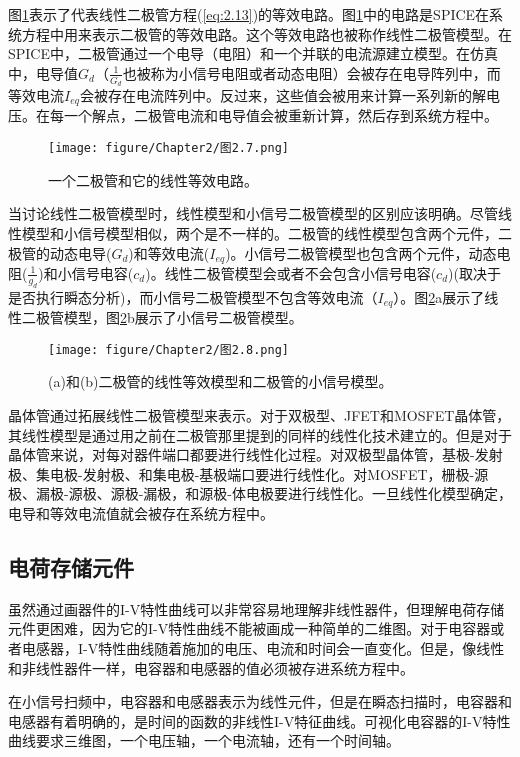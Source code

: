 图\ref{图2.7}表示了代表线性二极管方程(\ref{eq:2.13})的等效电路。图\ref{图2.7}中的电路是SPICE在系统方程中用来表示二极管的等效电路。这个等效电路也被称作线性二极管模型。在SPICE中，二极管通过一个电导（电阻）和一个并联的电流源建立模型。在仿真中，电导值$G_{d}$（$\frac{1}{G_d}$也被称为小信号电阻或者动态电阻）会被存在电导阵列中，而等效电流$I_{eq}$会被存在电流阵列中。反过来，这些值会被用来计算一系列新的解电压。在每一个解点，二极管电流和电导值会被重新计算，然后存到系统方程中。
\begin{figure}[htbp]
\small
    \centering
    \texttt{[image: figure/Chapter2/图2.7.png]}
    \caption{一个二极管和它的线性等效电路。}
    \label{图2.7}
\end{figure}

当讨论线性二极管模型时，线性模型和小信号二极管模型的区别应该明确。尽管线性模型和小信号模型相似，两个是不一样的。二极管的线性模型包含两个元件，二极管的动态电导($G_d$)和等效电流($I_{eq}$)。小信号二极管模型也包含两个元件，动态电阻($\frac{1}{g_d}$)和小信号电容($c_d$)。线性二极管模型会或者不会包含小信号电容($c_d$)(取决于是否执行瞬态分析)，而小信号二极管模型不包含等效电流（$I_{eq}$）。图\ref{图2.8}a展示了线性二极管模型，图\ref{图2.8}b展示了小信号二极管模型。
\begin{figure}[htbp]
\small
    \centering
    \texttt{[image: figure/Chapter2/图2.8.png]}
    \caption{(a)和(b)二极管的线性等效模型和二极管的小信号模型。}
    \label{图2.8}
\end{figure}

晶体管通过拓展线性二极管模型来表示。对于双极型、JFET和MOSFET晶体管，其线性模型是通过用之前在二极管那里提到的同样的线性化技术建立的。但是对于晶体管来说，对每对器件端口都要进行线性化过程。对双极型晶体管，基极-发射极、集电极-发射极、和集电极-基极端口要进行线性化。对MOSFET，栅极-源极、漏极-源极、源极-漏极，和源极-体电极要进行线性化。一旦线性化模型确定，电导和等效电流值就会被存在系统方程中。

\subsection{电荷存储元件}
虽然通过画器件的I-V特性曲线可以非常容易地理解非线性器件，但理解电荷存储元件更困难，因为它的I-V特性曲线不能被画成一种简单的二维图。对于电容器或者电感器，I-V特性曲线随着施加的电压、电流和时间会一直变化。但是，像线性和非线性器件一样，电容器和电感器的值必须被存进系统方程中。

在小信号扫频中，电容器和电感器表示为线性元件，但是在瞬态扫描时，电容器和电感器有着明确的，是时间的函数的非线性I-V特征曲线。可视化电容器的I-V特性曲线要求三维图，一个电压轴，一个电流轴，还有一个时间轴。


